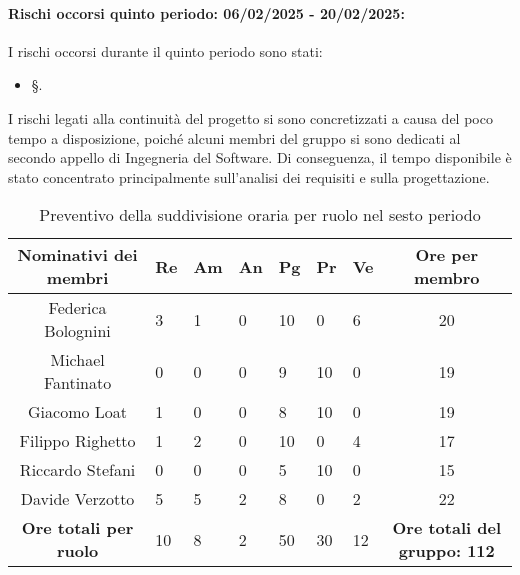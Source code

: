\paragraph{Rischi occorsi quinto periodo: 06/02/2025 - 20/02/2025: }
I rischi occorsi durante il quinto periodo sono stati:
\begin{itemize}
    \item \S{}.
\end{itemize}
I rischi legati alla continuità del progetto si sono concretizzati a causa del poco tempo a disposizione, poiché alcuni membri del gruppo si sono dedicati al secondo appello di Ingegneria del Software. Di conseguenza, il tempo disponibile è stato concentrato principalmente sull'analisi dei requisiti e sulla progettazione.
\newpage
{}
\begin{table}[h!]
    \centering
    \renewcommand{\arraystretch}{1.5}
    \begin{tabularx}{\textwidth}{|c|X|X|X|X|X|X|c|}\hline
    \rowcolor[HTML]{FFD700} 
    \textbf{Nominativi dei membri} & \textbf{Re} & \textbf{Am} & \textbf{An} & \textbf{Pg} & \textbf{Pr} & \textbf{Ve} & \textbf{Ore per membro} \\ \hline
    Federica Bolognini  & 3 & 1 & 0 & 10 & 0 & 6 & 20 \\ \hline
    Michael Fantinato   & 0 & 0 & 0 & 9 & 10 & 0 & 19 \\ \hline
    Giacomo Loat        & 1 & 0 & 0 & 8 & 10 & 0 & 19 \\ \hline
    Filippo Righetto    & 1 & 2 & 0 & 10 & 0 & 4 & 17 \\ \hline
    Riccardo Stefani    & 0 & 0 & 0 & 5 & 10 & 0 & 15 \\ \hline
    Davide Verzotto     & 5 & 5 & 2 & 8 & 0 & 2 & 22 \\ \hline
    \rowcolor[HTML]{FFD700} 
    \textbf{Ore totali per ruolo} & 10 & 8 & 2 & 50 & 30 & 12 & \textbf{Ore totali del gruppo: 112} \\ \hline
    \end{tabularx}
    \caption{Preventivo della suddivisione oraria per ruolo nel sesto periodo}
\end{table}


\newpage
